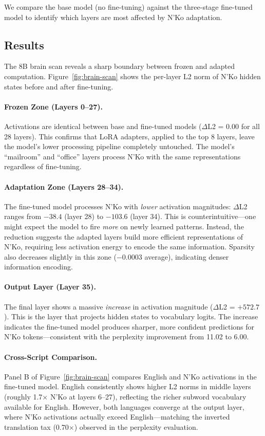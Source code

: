 \documentclass[11pt]{article}
\begin{document}
We compare the base model (no fine-tuning) against the three-stage fine-tuned model to identify which layers are most affected by N'Ko adaptation.

\subsection{Results}

The 8B brain scan reveals a sharp boundary between frozen and adapted computation.
Figure~\ref{fig:brain-scan} shows the per-layer L2 norm of N'Ko hidden states before and after fine-tuning.

\paragraph{Frozen Zone (Layers 0--27).}
Activations are identical between base and fine-tuned models ($\Delta$L2 = 0.00 for all 28 layers).
This confirms that LoRA adapters, applied to the top 8 layers, leave the model's lower processing pipeline completely untouched.
The model's ``mailroom'' and ``office'' layers process N'Ko with the same representations regardless of fine-tuning.

\paragraph{Adaptation Zone (Layers 28--34).}
The fine-tuned model processes N'Ko with \textit{lower} activation magnitudes: $\Delta$L2 ranges from $-38.4$ (layer 28) to $-103.6$ (layer 34).
This is counterintuitive---one might expect the model to fire \textit{more} on newly learned patterns.
Instead, the reduction suggests the adapted layers build more efficient representations of N'Ko, requiring less activation energy to encode the same information.
Sparsity also decreases slightly in this zone ($-0.0003$ average), indicating denser information encoding.

\paragraph{Output Layer (Layer 35).}
The final layer shows a massive \textit{increase} in activation magnitude ($\Delta$L2 = $+572.7$).
This is the layer that projects hidden states to vocabulary logits.
The increase indicates the fine-tuned model produces sharper, more confident predictions for N'Ko tokens---consistent with the perplexity improvement from 11.02 to 6.00.

\paragraph{Cross-Script Comparison.}
Panel B of Figure~\ref{fig:brain-scan} compares English and N'Ko activations in the fine-tuned model.
English consistently shows higher L2 norms in middle layers (roughly 1.7$\times$ N'Ko at layers 6--27), reflecting the richer subword vocabulary available for English.
However, both languages converge at the output layer, where N'Ko activations actually exceed English---matching the inverted translation tax (0.70$\times$) observed in the perplexity evaluation.
\end{document}
